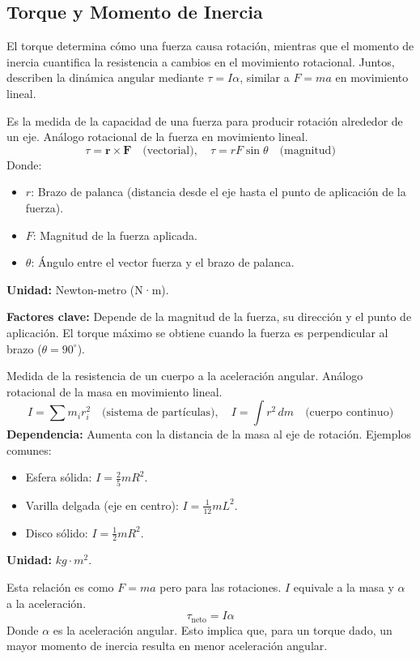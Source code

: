 \subsection{Torque y Momento de Inercia}
\label{sec:torque_y_momento_de_inercia}

El torque determina cómo una fuerza causa rotación, mientras que el momento de inercia cuantifica la resistencia a cambios en el movimiento rotacional. Juntos, describen la dinámica angular mediante \( \tau = I\alpha \), similar a \( F = ma \) en movimiento lineal.

\begin{tcolorbox}[remember, title=Torque (\(\tau\))]
  Es la medida de la capacidad de una fuerza para producir rotación alrededor de un eje. Análogo rotacional de la fuerza en movimiento lineal.  
  \[
    \tau = \mathbf{r} \times \mathbf{F} \quad \text{(vectorial)}, \quad \tau = rF\sin\theta \quad \text{(magnitud)}
  \]  
  Donde:
  \begin{itemize}
    \item \( r \): Brazo de palanca (distancia desde el eje hasta el punto de aplicación de la fuerza).
    \item \( F \): Magnitud de la fuerza aplicada.
    \item \( \theta \): Ángulo entre el vector fuerza y el brazo de palanca.
  \end{itemize}
  \textbf{Unidad:} Newton-metro (N·m).  

  \noindent\textbf{Factores clave:} Depende de la magnitud de la fuerza, su dirección y el punto de aplicación. El torque máximo se obtiene cuando la fuerza es perpendicular al brazo (\( \theta = 90^\circ \)).
\end{tcolorbox}

\begin{tcolorbox}[remember, title=Momento de Inercia (\(I\))]
  Medida de la resistencia de un cuerpo a la aceleración angular. Análogo rotacional de la masa en movimiento lineal.  
  \[
    I = \sum m_i r_i^2 \quad \text{(sistema de partículas)}, \quad I = \int r^2 \, dm \quad \text{(cuerpo continuo)}
  \]  
  \textbf{Dependencia:} Aumenta con la distancia de la masa al eje de rotación. Ejemplos comunes:
  \begin{itemize}
    \item Esfera sólida: \( I = \frac{2}{5} mR^2 \).
    \item Varilla delgada (eje en centro): \( I = \frac{1}{12} mL^2 \).
    \item Disco sólido: \( I = \frac{1}{2} mR^2 \).
  \end{itemize}
  \textbf{Unidad:} \(kg\cdot m^2\).  
\end{tcolorbox}

\begin{tcolorbox}[remember, title=Relación Fundamental (Segunda Ley de Newton para Rotación)]
  Esta relación es como \(F=ma\) pero para las rotaciones. \(I\) equivale a la masa y \(\alpha\) a la aceleración.
  \[
  \tau_{\text{neto}} = I \alpha
  \]  
  Donde \( \alpha \) es la aceleración angular. Esto implica que, para un torque dado, un mayor momento de inercia resulta en menor aceleración angular.
\end{tcolorbox}